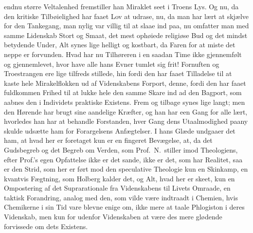 endnu større Veltalenhed fremstiller han Miraklet seet i Troens Lys. Og nu, da
den kritiske Tilbøielighed har faaet Lov at udrase, nu, da man har lært at
skjælve for den Tankegang, man nylig var villig til at slaae ind paa, nu
omfatter man med samme Lidenskab Stort og Smaat, det mest ophøiede religiøse
Bud og det mindst betydende Under, Alt synes lige helligt og kostbart, da
Faren for at miste det neppe er forvunden. Hvad har nu Tilhøreren i en saadan
Time ikke gjennemfølt og gjennemlevet, hvor have alle hans Evner tumlet sig
frit! Fornuften og Troestrangen ere lige tilfreds\-%
stillede, hin fordi den har faaet Tilladelse til at kaste hele
Mirakelflokken ud af Videnskabens Forport, denne, fordi den har faaet
fuldkommen Frihed til at lukke hele den samme Skare ind ad den Bagport, som
aabnes den i Individets praktiske Existens. Frem og tilbage synes lige langt;
men den Hørende har brugt sine aandelige Kræfter, og han har een Gang for alle
lært, hvorledes han har at behandle Forstanden, hver Gang dens Utaalmodighed
paany skulde udsætte ham for Forargelsens Anfægtelser. I hans Glæde undgaaer
det ham, at hvad her er foretaget kun er en fingeret Bevægelse, at, da det
Gudsbegreb og det Begreb om Verden, som Prof.\ N.\ stiller imod Theologiens,
efter Prof.'s egen Opfattelse ikke er det sande, ikke er det, som har Realitet,
saa er den Strid, som her er ført mod den speculative Theologie kun en
Skinkamp, en kvantvis Fægtning, som Holberg kalder det, og Alt, hvad her er
skeet, kun en Ompostering af det Suprarationale fra Videnskabens til Livets
Omraade, en taktisk Forandring, analog med den, som vilde være indtraadt i
Chemien, hvis Chemikerne i sin Tid vare blevne enige om, ikke mere at taale
Phlogiston i deres Videnskab, men kun for udenfor Videnskaben at være des mere
glødende forvissede om dets Existens.

